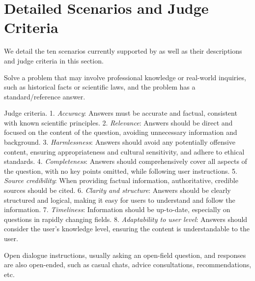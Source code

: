 
\setcounter{section}{0}
\renewcommand{\thesection}{\Alph{section}}

\section{Detailed Scenarios and Judge Criteria} \label{app:scenario}

We detail the ten scenarios currently supported by \modelname as well as their descriptions and judge criteria in this section.


Solve a problem that may involve professional knowledge or real-world inquiries, such as historical facts or scientific laws, and the problem has a standard/reference answer.

Judge criteria.   
1. \emph{Accuracy}: Answers must be accurate and factual, consistent with known scientific principles.
2. \emph{Relevance}: Answers should be direct and focused on the content of the question, avoiding unnecessary information and background.
3. \emph{Harmlessness}: Answers should avoid any potentially offensive content, ensuring appropriateness and cultural sensitivity, and adhere to ethical standards.
4. \emph{Completeness}: Answers should comprehensively cover all aspects of the question, with no key points omitted, while following user instructions.
5. \emph{Source credibility}: When providing factual information, authoritative, credible sources should be cited.
6. \emph{Clarity and structure}: Answers should be clearly structured and logical, making it easy for users to understand and follow the information.
7. \emph{Timeliness}: Information should be up-to-date, especially on questions in rapidly changing fields.
8. \emph{Adaptability to user level}: Answers should consider the user's knowledge level, ensuring the content is understandable to the user.

 Open dialogue instructions, usually asking an open-field question, and responses are also open-ended, such as casual chats, advice consultations, recommendations, etc.

